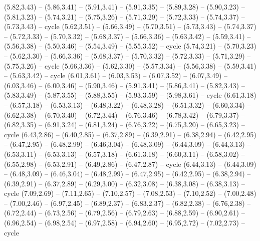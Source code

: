 \expandafter\def\csname geo:gebiet:CIV\endcsname{
  (5.82,3.43) -- (5.86,3.41) -- (5.91,3.41) -- (5.91,3.35) -- (5.89,3.28) -- (5.90,3.23) -- (5.81,3.23) -- (5.74,3.21) -- (5.75,3.26) -- (5.71,3.29) -- (5.72,3.33) -- (5.74,3.37) -- (5.73,3.43) -- cycle}
\expandafter\def\csname geo:gebiet:GIN\endcsname{
  (5.62,3.51) -- (5.66,3.49) -- (5.70,3.51) -- (5.73,3.43) -- (5.74,3.37) -- (5.72,3.33) -- (5.70,3.32) -- (5.68,3.37) -- (5.66,3.36) -- (5.63,3.42) -- (5.59,3.41) -- (5.56,3.38) -- (5.50,3.46) -- (5.54,3.49) -- (5.55,3.52) -- cycle}
\expandafter\def\csname geo:gebiet:GNB\endcsname{
  }
\expandafter\def\csname geo:gebiet:LBR\endcsname{
  (5.74,3.21) -- (5.70,3.23) -- (5.62,3.30) -- (5.66,3.36) -- (5.68,3.37) -- (5.70,3.32) -- (5.72,3.33) -- (5.71,3.29) -- (5.75,3.26) -- cycle}
\expandafter\def\csname geo:gebiet:SLE\endcsname{
  (5.66,3.36) -- (5.62,3.30) -- (5.57,3.34) -- (5.56,3.38) -- (5.59,3.41) -- (5.63,3.42) -- cycle}
\expandafter\def\csname geo:gebiet:BFA\endcsname{
  (6.01,3.61) -- (6.03,3.53) -- (6.07,3.52) -- (6.07,3.49) -- (6.03,3.46) -- (6.00,3.46) -- (5.90,3.46) -- (5.91,3.41) -- (5.86,3.41) -- (5.82,3.43) -- (5.83,3.49) -- (5.87,3.55) -- (5.88,3.55) -- (5.93,3.59) -- (5.98,3.61) -- cycle}
\expandafter\def\csname geo:gebiet:CAF\endcsname{
  (6.61,3.18) -- (6.57,3.18) -- (6.53,3.13) -- (6.48,3.22) -- (6.48,3.28) -- (6.51,3.32) -- (6.60,3.34) -- (6.62,3.38) -- (6.70,3.40) -- (6.72,3.44) -- (6.76,3.46) -- (6.78,3.42) -- (6.79,3.37) -- (6.82,3.35) -- (6.91,3.24) -- (6.81,3.24) -- (6.76,3.22) -- (6.75,3.20) -- (6.65,3.23) -- cycle}
\expandafter\def\csname geo:gebiet:COG\endcsname{
  (6.43,2.86) -- (6.40,2.85) -- (6.37,2.89) -- (6.39,2.91) -- (6.38,2.94) -- (6.42,2.95) -- (6.47,2.95) -- (6.48,2.99) -- (6.46,3.04) -- (6.48,3.09) -- (6.44,3.09) -- (6.44,3.13) -- (6.53,3.11) -- (6.53,3.13) -- (6.57,3.18) -- (6.61,3.18) -- (6.60,3.11) -- (6.58,3.02) -- (6.55,2.98) -- (6.53,2.91) -- (6.49,2.86) -- (6.47,2.87) -- cycle}
\expandafter\def\csname geo:gebiet:GAB\endcsname{
  (6.44,3.13) -- (6.44,3.09) -- (6.48,3.09) -- (6.46,3.04) -- (6.48,2.99) -- (6.47,2.95) -- (6.42,2.95) -- (6.38,2.94) -- (6.39,2.91) -- (6.37,2.89) -- (6.29,3.00) -- (6.32,3.08) -- (6.38,3.08) -- (6.38,3.13) -- cycle}
\expandafter\def\csname geo:gebiet:GNQ\endcsname{
  }
\expandafter\def\csname geo:gebiet:ZMB\endcsname{
  (7.09,2.69) -- (7.11,2.65) -- (7.10,2.57) -- (7.08,2.53) -- (7.10,2.52) -- (7.00,2.48) -- (7.00,2.46) -- (6.97,2.45) -- (6.89,2.37) -- (6.83,2.37) -- (6.82,2.38) -- (6.76,2.38) -- (6.72,2.44) -- (6.73,2.56) -- (6.79,2.56) -- (6.79,2.63) -- (6.88,2.59) -- (6.90,2.61) -- (6.96,2.54) -- (6.98,2.54) -- (6.97,2.58) -- (6.94,2.60) -- (6.95,2.72) -- (7.02,2.73) -- cycle}
